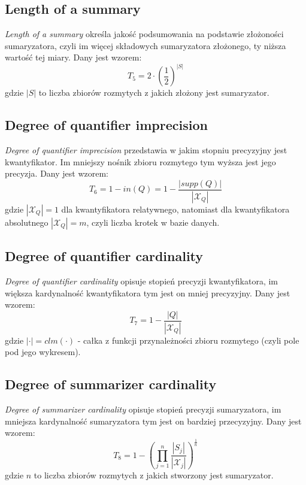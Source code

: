 \documentclass{classrep}
\begin{document}
	\subsection{Length of a summary}
\textsl{Length of a summary}  określa jakość podsumowania na podstawie złożoności sumaryzatora, czyli im więcej składowych sumaryzatora złożonego, ty niższa wartość tej miary. Dany jest wzorem:
\begin{equation}
T_5 = 2 \cdot \left( \frac{1}{2}\right)^{|S|} 
\end{equation}
gdzie $|S|$ to liczba zbiorów rozmytych z jakich złożony jest sumaryzator.


	\subsection{Degree of quantifier imprecision}
\textsl{Degree of quantifier imprecision} przedstawia w jakim stopniu precyzyjny jest kwantyfikator. Im mniejszy nośnik zbioru rozmytego  tym wyższa jest jego precyzja. Dany jest wzorem:
\begin{equation}
T_6 = 1 - in(Q) = 1 - \frac{|supp(Q)|}{|\mathcal{X}_Q|}
\end{equation}
gdzie $|\mathcal{X}_Q| = 1$ dla kwantyfikatora relatywnego, natomiast dla kwantyfikatora absolutnego $|\mathcal{X}_Q| = m$, czyli liczba krotek w bazie danych.


	\subsection{Degree of quantifier cardinality}
\textsl{Degree of quantifier cardinality} opisuje stopień precyzji kwantyfikatora, im większa kardynalność kwantyfikatora tym jest on mniej precyzyjny. Dany jest wzorem:
\begin{equation}
T_7 = 1 - \frac{|Q|}{|\mathcal{X}_Q|}
\end{equation}
gdzie $|\cdot| = clm(\cdot)$ - całka z funkcji przynależności zbioru rozmytego (czyli pole pod jego wykresem).


	\subsection{Degree of summarizer cardinality}
\textsl{Degree of summarizer cardinality} opisuje stopień precyzji sumaryzatora, im mniejsza kardynalność sumaryzatora tym jest on bardziej przecyzyjny. Dany jest wzorem:
\begin{equation}
T_8 = 1- \left(\prod_{j=1}^{n} \frac{|S_j|}{|\mathcal{X}_j|}\right)^{\frac{1}{n}}
\end{equation}
gdzie $n$ to liczba zbiorów rozmytych z jakich stworzony jest sumaryzator.
\end{document}
